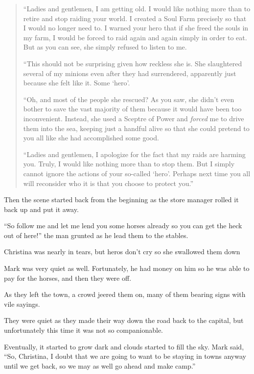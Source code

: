 \documentclass[showtrims,b6paper,draft,10pt]{memoir}
\begin{document}
\begin{quote}
``Ladies and gentlemen, I am getting old.  I would like nothing more than to retire and stop raiding your world.  I created a Soul Farm precisely so that I would no longer need to.  I warned your hero that if she freed the souls in my farm, I would be forced to raid again and again simply in order to eat.  But as you can see, she simply refused to listen to me.

``This should not be surprising given how reckless she is.  She slaughtered several of my minions even after they had surrendered, apparently just because she felt like it.  Some `hero'.

``Oh, and most of the people she rescued?  As you saw, she didn't even bother to save the vast majority of them because it would have been too inconvenient.  Instead, she used a Sceptre of Power and \emph{forced} me to drive them into the sea, keeping just a handful alive so that she could pretend to you all like she had accomplished some good.

``Ladies and gentlemen, I apologize for the fact that my raids are harming you.  Truly, I would like nothing more than to stop them.  But I simply cannot ignore the actions of your so-called `hero'.  Perhaps next time you all will reconsider who it is that you choose to protect you.''
\end{quote}

Then the scene started back from the beginning as the store manager rolled it back up and put it away.

``So follow me and let me lend you some horses already so you can get the heck out of here!''  the man grunted as he lead them to the stables.

Christina was nearly in tears, but heros don't cry so she swallowed them down

Mark was very quiet as well.  Fortunately, he had money on him so he was able to pay for the horses, and then they were off.

As they left the town, a crowd jeered them on, many of them bearing signs with vile sayings.

\timeskip
They were quiet as they made their way down the road back to the capital, but unfortunately this time it was not so companionable.

Eventually, it started to grow dark and clouds started to fill the sky.  Mark said, ``So, Christina, I doubt that we are going to want to be staying in towns anyway until we get back, so we may as well go ahead and make camp.''
\end{document}
